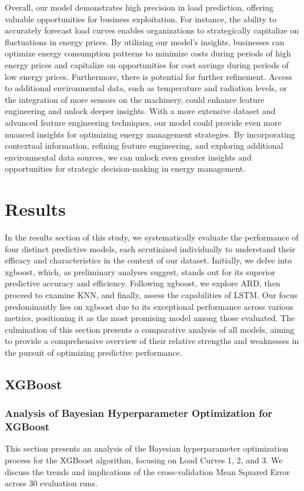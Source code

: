 \documentclass{article} %
\begin{document}
Overall, our model demonstrates high precision in load prediction, offering valuable opportunities for business exploitation. For instance, the ability to accurately forecast load curves enables organizations to strategically capitalize on fluctuations in energy prices. By utilizing our model's insights, businesses can optimize energy consumption patterns to minimize costs during periods of high energy prices and capitalize on opportunities for cost savings during periods of low energy prices. Furthermore, there is potential for further refinement. Access to additional environmental data, such as temperature and radiation levels, or the integration of more sensors on the machinery, could enhance feature engineering and unlock deeper insights. With a more extensive dataset and advanced feature engineering techniques, our model could provide even more nuanced insights for optimizing energy management strategies. By incorporating contextual information, refining feature engineering, and exploring additional environmental data sources, we can unlock even greater insights and opportunities for strategic decision-making in energy management.

\section{Results}
In the results section of this study, we systematically evaluate the performance of four distinct predictive models, each scrutinized individually to understand their efficacy and characteristics in the context of our dataset. Initially, we delve into \gls*{xgboost}, which, as preliminary analyses suggest, stands out for its superior predictive accuracy and efficiency. Following \gls*{xgboost}, we explore \gls*{ARD}, then proceed to examine \gls*{KNN}, and finally, assess the capabilities of \gls*{LSTM}. Our focus predominantly lies on \gls*{xgboost} due to its exceptional performance across various metrics, positioning it as the most promising model among those evaluated. The culmination of this section presents a comparative analysis of all models, aiming to provide a comprehensive overview of their relative strengths and weaknesses in the pursuit of optimizing predictive performance. 

\subsection{XGBoost}

\subsubsection{Analysis of Bayesian Hyperparameter Optimization for XGBoost}
This section presents an analysis of the Bayesian hyperparameter optimization process for the XGBoost algorithm, focusing on Load Curves 1, 2, and 3. We discuss the trends and implications of the cross-validation Mean Squared Error across 30 evaluation runs.
\end{document}
